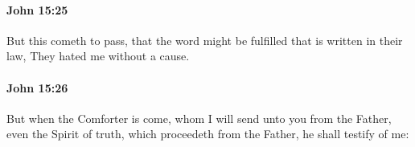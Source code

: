 		\paragraph{John 15:25} %
			\label{JOHN-15-25}

			But this cometh to pass, that the word might be fulfilled that is written in their law, They hated me without a cause.

			\begin{framed}
				\scriptsize
				\begin{compactdesc}
					\item[SBLG] 
				\end{compactdesc}
			\end{framed}

		\paragraph{John 15:26} %
			\label{JOHN-15-26}

			But when the Comforter is come, whom I will send unto you from the Father, even the Spirit of truth, which proceedeth from the Father, he shall testify of me:

